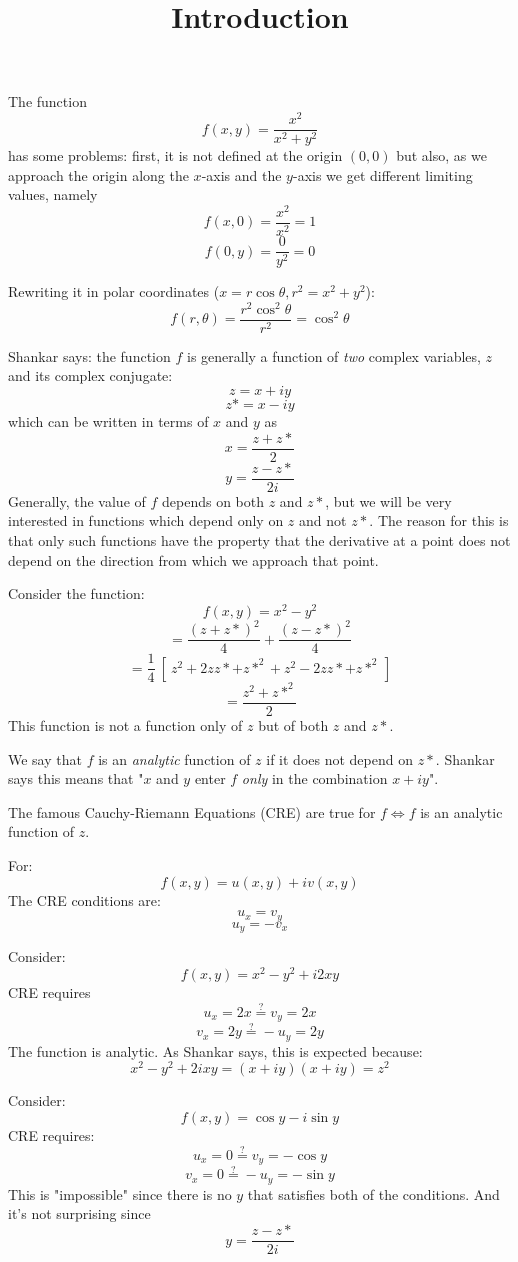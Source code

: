 \documentclass[11pt, oneside]{article}
\title{Introduction}
\date{}
\begin{document}
\maketitle
\Large


The function
\[ f(x,y) = \frac{x^2}{x^2 + y^2} \]
has some problems:  first, it is not defined at the origin $(0,0)$ but also, as we approach the origin along the $x$-axis and the $y$-axis we get different limiting values, namely
\[ f(x,0) = \frac{x^2}{x^2} = 1 \]
\[ f(0,y) = \frac{0}{y^2} = 0 \]

Rewriting it in polar coordinates ($x = r \cos \theta, r^2 = x^2 + y^2$):
\[ f(r,\theta) = \frac{r^2 \cos^2 \theta}{r^2} = \cos^2 \theta \]

Shankar says:  the function $f$ is generally a function of \emph{two} complex variables, $z$ and its complex conjugate:
\[ z = x + iy \]
\[ z* = x - iy \]
which can be written in terms of $x$ and $y$ as
\[ x = \frac{z + z*}{2} \]
\[ y = \frac{z - z*}{2i} \]
Generally, the value of $f$ depends on both $z$ and $z*$, but we will be very interested in functions which depend only on $z$ and not $z*$.  The reason for this is that only such functions have the property that the derivative at a point does not depend on the direction from which we approach that point.

Consider the function:
\[ f(x,y) = x^2 - y^2 \]
\[ = \frac{(z+z*)^2}{4} + \frac{(z-z*)^2}{4} \]
\[ = \frac{1}{4} \ [ \ z^2 + 2zz* + z*^2 + z^2 - 2zz* + z*^2 \ ] \]
\[ = \frac{z^2 + z*^2}{2} \]
This function is not a function only of $z$ but of both $z$ and $z*$.

We say that $f$ is an \emph{analytic} function of $z$ if it does not depend on $z*$.  Shankar says this means that "$x$ and $y$ enter $f$ \emph{only} in the combination $x + iy$".

The famous Cauchy-Riemann Equations (CRE) are true for $f \iff f$ is an analytic function of $z$.  

For:
\[ f(x,y) = u(x,y) + iv(x,y) \]
The CRE conditions are:
\[ u_x = v_y \]
\[ u_y = -v_x \]

Consider:
\[ f(x,y) = x^2 - y^2 + i2xy \]
CRE requires
\[ u_x = 2x \stackrel{?}{=}  v_y = 2x \]
\[ v_x = 2y \stackrel{?}{=} - u_y = 2y \]
The function is analytic.  As Shankar says, this is expected because:
\[ x^2 - y^2 + 2ixy = (x + iy)(x + iy) = z^2 \]

Consider:
\[ f(x,y) = \cos y - i \sin y \]
CRE requires:
\[ u_x = 0 \stackrel{?}{=} v_y = - \cos y \]
\[ v_x = 0 \stackrel{?}{=}  -u_y = - \sin y \]
This is "impossible" since there is no $y$ that satisfies both of the conditions.  And it's not surprising since
\[ y = \frac{z - z*}{2i} \]
\end{document}
